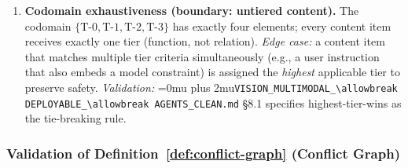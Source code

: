 \documentclass[12pt]{article}
\theoremstyle{definition}
\DeclareRobustCommand{\code}[1]{\begingroup\Urlmuskip=0mu plus 2mu\relax\nolinkurl{#1}\endgroup}
\newcommand{\VisionClean}{\code{VISION\_MULTIMODAL\_\allowbreak DEPLOYABLE\_\allowbreak AGENTS\_CLEAN.md}}
\begin{document}
\begin{enumerate}[label=\textbf{T\arabic*.}, leftmargin=*, widest=T9]
  \item \textbf{Codomain exhaustiveness (boundary: untiered
        content).}
        The codomain
        $\{\mathrm{T\text{-}0}, \mathrm{T\text{-}1},
         \mathrm{T\text{-}2}, \mathrm{T\text{-}3}\}$
        has exactly four elements; every content item receives
        exactly one tier (function, not relation).
        \emph{Edge case:} a content item that matches multiple tier
        criteria simultaneously (e.g., a user instruction that also
        embeds a model constraint) is assigned the \emph{highest}
        applicable tier to preserve safety.
        \emph{Validation:} \VisionClean{} \S8.1 specifies
        highest-tier-wins as the tie-breaking rule.

\end{enumerate}

\subsubsection{Validation of Definition~\ref{def:conflict-graph}
               (Conflict Graph)}
\label{sec:val-conflict}
\end{document}
